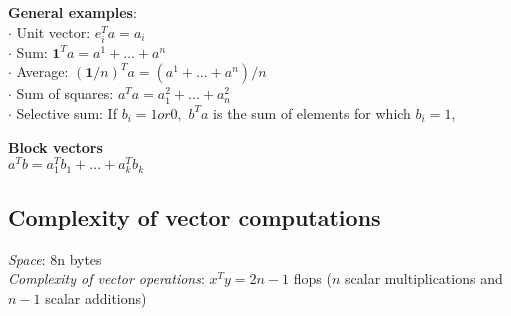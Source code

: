 \textbf{General examples}:\\
$\cdot$ Unit vector: $e_i^T a = a_i$ \\
$\cdot$ Sum: $\textbf{1}^T a = a^1 + ... + a^n$ \\
$\cdot$ Average: $(\textbf{1}/n)^T a=(a^1+...+a^n)/n$\\ 
$\cdot$ Sum of squares: $a^Ta = a^2_1 +...+a^2_n$\\
$\cdot$ Selective sum: If $b_i = 1 or 0,$ \textit{$b^Ta$} is the sum of elements for which $b_i = 1$,

\textbf{Block vectors}\\
$a^T b = a_1^T b_1 + ... + a_k^T b_k$

\subsection{Complexity of vector computations}
\textit{Space}:  8n bytes\\
\textit{Complexity of vector operations}: $x^Ty=2n-1$ flops ($n$ scalar multiplications and $n-1$ scalar additions)
